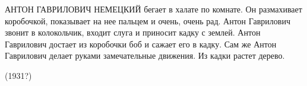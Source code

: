 	АНТОН  ГАВРИЛОВИЧ  НЕМЕЦКИЙ бегает в халате по комнате.
	Он размахивает коробочкой,	показывает  на нее  пальцем и  очень,  очень рад.
	Антон  Гаврилович  звонит в колокольчик, входит слуга и приносит кадку с землей.
	Антон  Гаврилович достает  из  коробочки боб и сажает его в кадку.
	Сам же Антон Гаврилович делает руками замечательные  движения.
	Из кадки растет дерево.

	\begin{flushright}
		(1931?)
	\end{flushright}